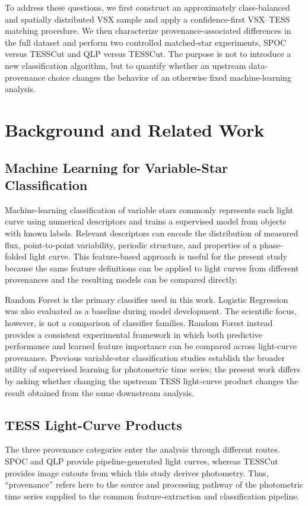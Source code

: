 \documentclass[linenumbers]{aastex701}
\begin{document}
To address these questions, we first construct an approximately class-balanced and spatially distributed VSX sample and apply a confidence-first VSX--TESS matching procedure. We then characterize provenance-associated differences in the full dataset and perform two controlled matched-star experiments, SPOC versus TESSCut and QLP versus TESSCut. The purpose is not to introduce a new classification algorithm, but to quantify whether an upstream data-provenance choice changes the behavior of an otherwise fixed machine-learning analysis.

\section{Background and Related Work}
\label{sec:background}

\subsection{Machine Learning for Variable-Star Classification}
Machine-learning classification of variable stars commonly represents each light curve using numerical descriptors and trains a supervised model from objects with known labels. Relevant descriptors can encode the distribution of measured flux, point-to-point variability, periodic structure, and properties of a phase-folded light curve. This feature-based approach is useful for the present study because the same feature definitions can be applied to light curves from different provenances and the resulting models can be compared directly.

Random Forest is the primary classifier used in this work. Logistic Regression was also evaluated as a baseline during model development. The scientific focus, however, is not a comparison of classifier families. Random Forest instead provides a consistent experimental framework in which both predictive performance and learned feature importance can be compared across light-curve provenance. Previous variable-star classification studies establish the broader utility of supervised learning for photometric time series; the present work differs by asking whether changing the upstream TESS light-curve product changes the result obtained from the same downstream analysis.


\subsection{TESS Light-Curve Products}
The three provenance categories enter the analysis through different routes. SPOC and QLP provide pipeline-generated light curves, whereas TESSCut provides image cutouts from which this study derives photometry. Thus, ``provenance'' refers here to the source and processing pathway of the photometric time series supplied to the common feature-extraction and classification pipeline.
\end{document}
